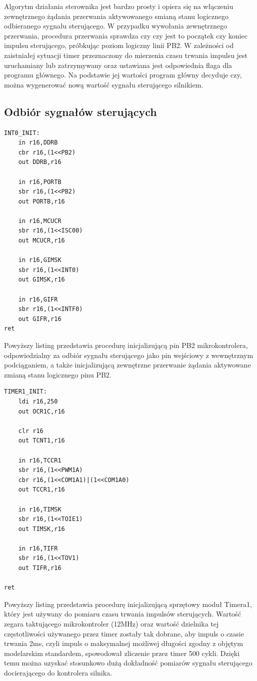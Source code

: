 Algorytm działania sterownika jest bardzo prosty i opiera się na włączeniu zewnętrznego żądania przerwania aktywowanego smianą stanu logicznego odbieranego sygnału sterującego. W przypadku wywołania zewnętrznego przerwania, procedura przerwania sprawdza czy czy jest to początek czy koniec impulsu sterującego, próbkując poziom logiczny linii PB2. W zależności od zaistniałej sytuacji timer przeznaczony do mierzenia czasu trwania impulsu jest uruchamiany lub zatrzymywany oraz ustawiana jest odpowiednia flaga dla programu głównego. Na podstawie jej wartości program główny decyduje czy, można wygenerować nową wartość sygnału sterującego silnikiem.


\subsection{Odbiór sygnałów sterujących}

\begin{lstlisting}
INT0_INIT:
	in r16,DDRB
	cbr r16,(1<<PB2)
	out DDRB,r16	

	in r16,PORTB
	sbr r16,(1<<PB2)
	out PORTB,r16

	in r16,MCUCR
	sbr r16,(1<<ISC00)
	out MCUCR,r16

	in r16,GIMSK
	sbr r16,(1<<INT0)
	out GIMSK,r16

	in r16,GIFR
	sbr r16,(1<<INTF0)
	out GIFR,r16
ret
\end{lstlisting}

Powyższy listing przedstawia procedurę inicjalizującą pin PB2 mikrokontrolera, odpowiedzialny za odbiór sygnału sterującego jako pin wejściowy z wewnętrznym podciąganiem, a także inicjalizującą zewnętrzne przerwanie żądania aktywowane zmianą stanu logicznego pinu PB2. 

\begin{lstlisting}
TIMER1_INIT:
	ldi r16,250
	out OCR1C,r16

	clr r16
	out TCNT1,r16

	in r16,TCCR1
	sbr r16,(1<<PWM1A)
	cbr r16,(1<<COM1A1)|(1<<COM1A0)
	out TCCR1,r16

	in r16,TIMSK
	sbr r16,(1<<TOIE1)
	out TIMSK,r16

	in r16,TIFR
	sbr r16,(1<<TOV1)
	out TIFR,r16
	
ret
\end{lstlisting}
 
Powyższy listing przedstawia procedurę inicjalizującą sprzętowy moduł Timera1, który jest używany do pomiaru czasu trwania impulsów sterujących. Wartość zegara taktującego mikrokontroler (12MHz) oraz wartość dzielnika tej częstotliwości używanego przez timer zostały tak dobrane, aby impuls o czasie trwania 2ms, czyli impuls o maksymalnej możliwej długości zgodny z objętym modelarskim standardem, spowodował zliczenie przez timer 500 cykli. Dzięki temu można uzyskać stosunkowo dużą dokładność pomiarów sygnału sterującego docierającego do kontrolera silnika. 

